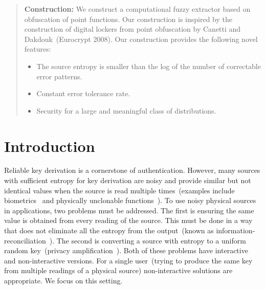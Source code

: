 \documentclass[11pt]{article}
\begin{document}
\begin{abstract}
\textbf{Construction:} We construct a computational fuzzy extractor based on obfuscation of point functions.  %
Our construction is inspired by the construction of digital lockers from point obfuscation by Canetti and Dakdouk~(Eurocrypt 2008).  
Our construction provides the following novel features:
\begin{itemize}
\item The source entropy is smaller than the log of the number of correctable error patterns.  
\item Constant error tolerance rate.  %
\item Security for a large and meaningful class of distributions.  %
\end{itemize}
\end{abstract}


\section{Introduction}\label{sec:introduction}
Reliable key derivation is a cornerstone of authentication.  However, many sources with sufficient entropy for key derivation are noisy and provide similar but not identical values when the source is read multiple times~(examples include biometrics~\cite{daugman2004} and physically unclonable functions~\cite{pappu2002physical}).  To use noisy physical sources in applications, two problems must be addressed.  The first is ensuring the same value is obtained from every reading of the source.  This must be done in a way that does not eliminate all the entropy from the output~(known as information-reconciliation~\cite{bennett1988privacy}).  The second is converting a source with entropy to a uniform random key~(privacy amplification~\cite{bennett1988privacy}).  Both of these problems have interactive and non-interactive versions.  For a single user~(trying to produce the same key from multiple readings of a physical source) non-interactive solutions are appropriate.  We focus on this setting.  %
\end{document}
